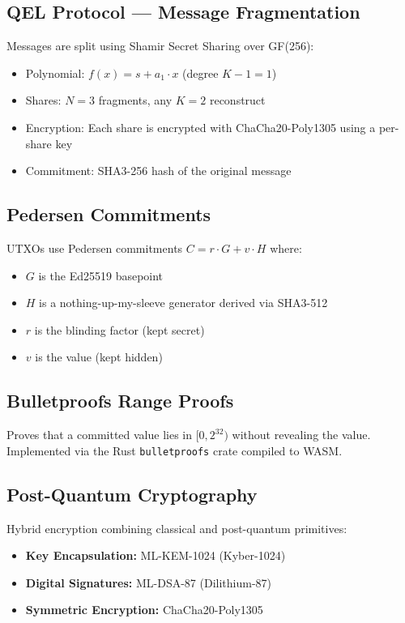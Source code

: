 \documentclass[11pt,a4paper]{article}
\begin{document}
\subsection{QEL Protocol --- Message Fragmentation}
Messages are split using Shamir Secret Sharing over GF(256):

\begin{itemize}[nosep]
  \item Polynomial: $f(x) = s + a_1 \cdot x$ (degree $K-1 = 1$)
  \item Shares: $N=3$ fragments, any $K=2$ reconstruct
  \item Encryption: Each share is encrypted with ChaCha20-Poly1305 using a per-share key
  \item Commitment: SHA3-256 hash of the original message
\end{itemize}

\subsection{Pedersen Commitments}
UTXOs use Pedersen commitments $C = r \cdot G + v \cdot H$ where:
\begin{itemize}[nosep]
  \item $G$ is the Ed25519 basepoint
  \item $H$ is a nothing-up-my-sleeve generator derived via SHA3-512
  \item $r$ is the blinding factor (kept secret)
  \item $v$ is the value (kept hidden)
\end{itemize}

\subsection{Bulletproofs Range Proofs}
Proves that a committed value lies in $[0, 2^{32})$ without revealing the value. Implemented via the Rust \texttt{bulletproofs} crate compiled to WASM.

\subsection{Post-Quantum Cryptography}
Hybrid encryption combining classical and post-quantum primitives:
\begin{itemize}[nosep]
  \item \textbf{Key Encapsulation:} ML-KEM-1024 (Kyber-1024)
  \item \textbf{Digital Signatures:} ML-DSA-87 (Dilithium-87)
  \item \textbf{Symmetric Encryption:} ChaCha20-Poly1305
\end{itemize}
\end{document}
